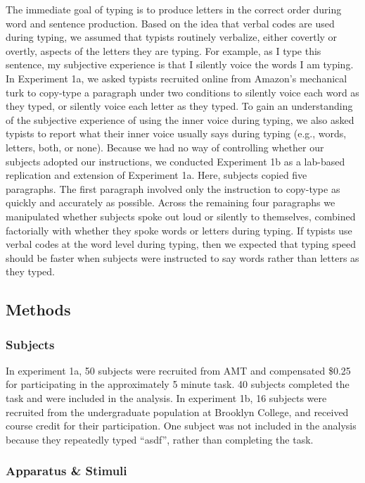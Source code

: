 \documentclass[,man,floatsintext]{apa6}
\begin{document}
The immediate goal of typing is to produce letters in the correct order during word and sentence production. Based on the idea that verbal codes are used during typing, we assumed that typists routinely verbalize, either covertly or overtly, aspects of the letters they are typing. For example, as I type this sentence, my subjective experience is that I silently voice the words I am typing. In Experiment 1a, we asked typists recruited online from Amazon's mechanical turk to copy-type a paragraph under two conditions to silently voice each word as they typed, or silently voice each letter as they typed. To gain an understanding of the subjective experience of using the inner voice during typing, we also asked typists to report what their inner voice usually says during typing (e.g., words, letters, both, or none). Because we had no way of controlling whether our subjects adopted our instructions, we conducted Experiment 1b as a lab-based replication and extension of Experiment 1a. Here, subjects copied five paragraphs. The first paragraph involved only the instruction to copy-type as quickly and accurately as possible. Across the remaining four paragraphs we manipulated whether subjects spoke out loud or silently to themselves, combined factorially with whether they spoke words or letters during typing. If typists use verbal codes at the word level during typing, then we expected that typing speed should be faster when subjects were instructed to say words rather than letters as they typed.

\hypertarget{methods}{%
\subsection{Methods}\label{methods}}

\hypertarget{subjects}{%
\subsubsection{Subjects}\label{subjects}}

In experiment 1a, 50 subjects were recruited from AMT and compensated \$0.25 for participating in the approximately 5 minute task. 40 subjects completed the task and were included in the analysis. In experiment 1b, 16 subjects were recruited from the undergraduate population at Brooklyn College, and received course credit for their participation. One subject was not included in the analysis because they repeatedly typed \enquote{asdf}, rather than completing the task.

\hypertarget{apparatus-stimuli}{%
\subsubsection{Apparatus \& Stimuli}\label{apparatus-stimuli}}
\end{document}
